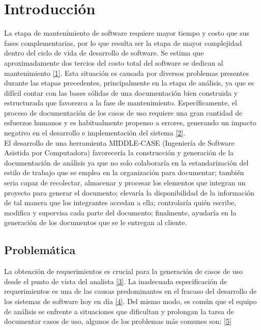 


\chapter{Introducción}
La etapa de mantenimiento de software requiere mayor tiempo y costo que sus fases complementarias, por lo que resulta ser la etapa de mayor complejidad dentro del ciclo de vida de desarrollo de software. Se estima que aproximadamente dos tercios del costo total del software se dedican al mantenimiento \hyperlink{b01}{[1]}. Esta situación es causada por diversos problemas presentes durante las etapas precedentes, principalmente en la etapa de análisis, ya que es difícil contar con las bases sólidas de una documentación bien construida y estructurada que favorezca a la fase de mantenimiento. Específicamente, el proceso de documentación de los casos de uso requiere una gran cantidad de esfuerzos humanos y es habitualmente propenso a errores, generando un impacto negativo en el desarrollo e implementación del sistema \hyperlink{b02}{[2]}. \\

El desarrollo de una herramienta MIDDLE-CASE (Ingeniería de Software Asistida por Computadora) favorecería la construcción y generación de la documentación de análisis ya que no solo colaboraría en la estandarización del estilo de trabajo que se emplea en la organización para documentar; también seria capaz de recolectar, almacenar y procesar los elementos que integran un proyecto para generar el documento; elevaría la disponibilidad de la información de tal manera que los integrantes accedan a ella; controlaría quién escribe, modifica y supervisa cada parte del documento; finalmente, ayudaría en la generación de los documentos que se le entregan al cliente.

\newpage
\section{Problemática}

La obtención de requerimientos es crucial para la generación de casos de uso desde el punto de vista del analista \hyperlink{b03}{[3]}. La inadecuada especificación de requerimientos es una de las causas predominantes en el fracaso del desarrollo de los sistemas de software hoy en día \hyperlink{b04}{[4]}. Del mismo modo, es común que el equipo de análisis se enfrente a situaciones que dificultan y prolongan la tarea de documentar casos de uso, algunos de los problemas más comunes son: \hyperlink{b05}{[5]}

